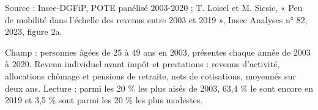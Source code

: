 Source : Insee-DGFiP, POTE panélisé 2003-2020 ; T. Loisel et M. Sicsic, « Peu de mobilité dans l'échelle des revenus entre 2003 et 2019 », Insee Analyses n° 82, 2023, figure 2a.\par Champ : personnes âgées de 25 à 49 ans en 2003, présentes chaque année de 2003 à 2020. Revenu individuel avant impôt et prestations : revenus d'activité, allocations chômage et pensions de retraite, nets de cotisations, moyennés sur deux ans. Lecture : parmi les 20 \% les plus aisés de 2003, 63,4 \% le sont encore en 2019 et 3,5 \% sont parmi les 20 \% les plus modestes.
